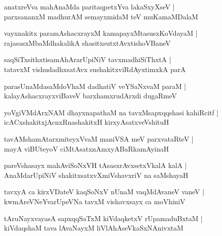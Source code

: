 \documentclass[twoside,12pt,openright]{book}
\newcounter{shloka}[chapter]
\begin{document}
\begin{shloka}%
anatxreVva mahAnaMda paritaqpetxYva lakaSxyXseV |\\
parxsananxM madhurAM semayxmidaM teV muKamaMDalaM 
\end{shloka}

\begin{shloka}%
vayxnakitx paramAshacxrayxM kamapayxMtasusxKoVdayaM |\\
rajasasxMbaMdhakalikA shasitxsutxtAvxtishoVBaneV 
\end{shloka}

\begin{shloka}%
saqSiTxsithxtisamAhArarUpiNiV tavxmadhiSiThxtA |\\
tatavxM vishudadhxsatAvx sushakitxviRdAyxtimxkA parA 
\end{shloka}

\begin{shloka}%
parasUnaMdasaMdoVhaM dadhatiV veYSaNxvaM paraM |\\
kalayAshacxrayxviBaveV barxhamxrudArxdi dugaRmeV 
\end{shloka}

\begin{shloka}%
yoVgiVMdArxNAM dhayxnapathaM na tavxMsapxqqshasi kahiRcitf |\\
icACxshakitxjAcnxRnashakitxH kirxyAsatxveVshituH 
\end{shloka}

\begin{shloka}%
tavAMshamAtarxmiteyxVvaM maniVSA meV parxvataRteV |\\
mayA viBUteyoV ciMtAsatxnAmxyABaRkamAyinaH 
\end{shloka}

\begin{shloka}%
pareVshasayx mahAviSoNxVH tAsasxrAvxsetxVkalA kalA |\\
AnaMdarUpiNiV shakitxsatxvXmiVshavxriV na saMshayaH 
\end{shloka}

\begin{shloka}%
tavxyA ca kirxVDateV kaqSoNxV nUnaM vaqMdAvaneV vaneV |\\
kwmAreVNeYvarUpeVNa tavxM vishavxsayx ca moVhiniV 
\end{shloka}

\begin{shloka}%
tAruNayxvayasA sapxqqSaTxM kiVdaqketxV rUpamaduBxtaM |\\
kiVdaqshaM tava lAvaNayxM liVlAhAseVkaSxNAnivxtaM 
\end{shloka}
\end{document}
